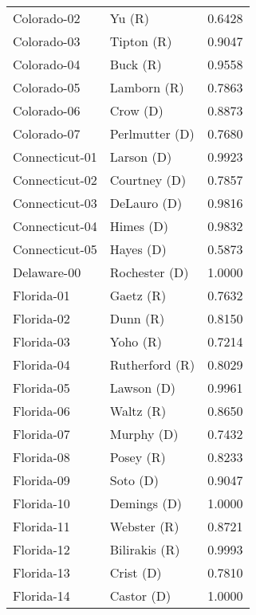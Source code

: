 \begin{longtable}{llr}
       Colorado-02 &               Yu (R) &       0.6428 \\
       Colorado-03 &           Tipton (R) &       0.9047 \\
       Colorado-04 &             Buck (R) &       0.9558 \\
       Colorado-05 &          Lamborn (R) &       0.7863 \\
       Colorado-06 &             Crow (D) &       0.8873 \\
       Colorado-07 &       Perlmutter (D) &       0.7680 \\
    Connecticut-01 &           Larson (D) &       0.9923 \\
    Connecticut-02 &         Courtney (D) &       0.7857 \\
    Connecticut-03 &          DeLauro (D) &       0.9816 \\
    Connecticut-04 &            Himes (D) &       0.9832 \\
    Connecticut-05 &            Hayes (D) &       0.5873 \\
       Delaware-00 &        Rochester (D) &       1.0000 \\
        Florida-01 &            Gaetz (R) &       0.7632 \\
        Florida-02 &             Dunn (R) &       0.8150 \\
        Florida-03 &             Yoho (R) &       0.7214 \\
        Florida-04 &       Rutherford (R) &       0.8029 \\
        Florida-05 &           Lawson (D) &       0.9961 \\
        Florida-06 &            Waltz (R) &       0.8650 \\
        Florida-07 &           Murphy (D) &       0.7432 \\
        Florida-08 &            Posey (R) &       0.8233 \\
        Florida-09 &             Soto (D) &       0.9047 \\
        Florida-10 &          Demings (D) &       1.0000 \\
        Florida-11 &          Webster (R) &       0.8721 \\
        Florida-12 &        Bilirakis (R) &       0.9993 \\
        Florida-13 &            Crist (D) &       0.7810 \\
        Florida-14 &           Castor (D) &       1.0000 \\

\end{longtable}
